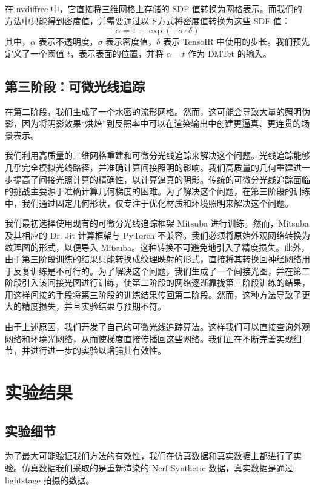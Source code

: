 在 nvdiffrec 中，它直接将三维网格上存储的 SDF 值转换为网格表示。而我们的方法中只能得到密度值，并需要通过以下方式将密度值转换为这些 SDF 值：
\[ \alpha = 1 - \exp(-\sigma \cdot \delta) \]
其中，$\alpha$ 表示不透明度，$\sigma$ 表示密度值，$\delta$ 表示 TensoIR 中使用的步长。我们预先定义了一个阈值 $t$，表示表面的位置，并将 $\alpha - t$ 作为 DMTet 的输入。

\subsection{第三阶段：可微光线追踪}

在第二阶段，我们生成了一个水密的流形网格。然而，这可能会导致大量的照明伪影，因为将阴影效果“烘焙”到反照率中可以在渲染输出中创建更逼真、更连贯的场景表示。

我们利用高质量的三维网格重建和可微分光线追踪来解决这个问题。光线追踪能够几乎完全模拟光线路径，并准确计算间接照明的影响。我们高质量的几何重建进一步提高了间接光照计算的精确性，以计算逼真的阴影。传统的可微分光线追踪面临的挑战主要源于准确计算几何梯度的困难。为了解决这个问题，在第三阶段的训练中，我们通过固定几何形状，仅专注于优化材质和环境照明来解决这个问题。

我们最初选择使用现有的可微分光线追踪框架 Mitsuba\cite{Mitsuba3} 进行训练。然而，Mitsuba 及其相应的 Dr. Jit\cite{Drjit} 计算框架与 PyTorch 不兼容。我们必须将原始外观网络转换为纹理图的形式，以便导入 Mitsuba。这种转换不可避免地引入了精度损失。此外，由于第三阶段训练的结果只能转换成纹理映射的形式，直接将其转换回神经网络用于反复训练是不可行的。为了解决这个问题，我们生成了一个间接光图，并在第二阶段引入该间接光图进行训练，使第二阶段的网络逐渐靠拢第三阶段训练的结果，用这样间接的手段将第三阶段的训练结果传回第二阶段。然而，这种方法导致了更大的精度损失，并且实验结果与预期不符。

由于上述原因，我们开发了自己的可微光线追踪算法。这样我们可以直接查询外观网络和环境光网络，从而使梯度直接传播回这些网络。我们正在不断完善实现细节，并进行进一步的实验以增强其有效性。

\section{实验结果}

\subsection*{实验细节}

为了最大可能验证我们方法的有效性，我们在仿真数据和真实数据上都进行了实验。仿真数据我们采取的是重新渲染的 Nerf-Synthetic 数据，真实数据是通过 lightstage 拍摄的数据。


